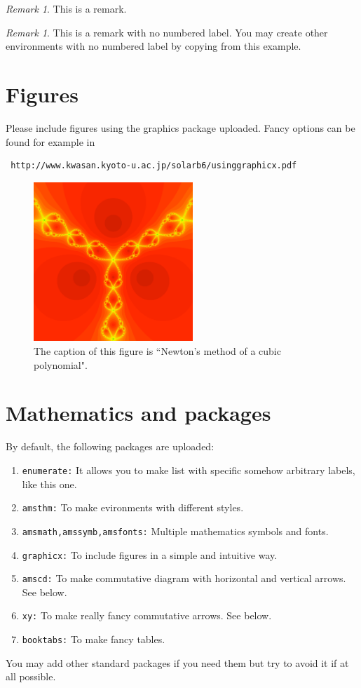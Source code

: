 \documentclass[12,twoside]{TFG-GM}
\theoremstyle{definition}
\theoremstyle{remark}
\newtheorem{remark}[theorem]{Remark}
\newtheorem*{remarknonumber}{Remark}
\begin{document}
\begin{remark}
This is a remark. 
\end{remark}

\begin{remarknonumber}
This is a remark with no numbered label. You may create other environments with no numbered label by copying from this example.
\end{remarknonumber}

\section{Figures}

Please include figures using the graphics package uploaded.  Fancy options can be found for example in  \begin{verbatim} http://www.kwasan.kyoto-u.ac.jp/solarb6/usinggraphicx.pdf \end{verbatim}

\begin{figure}[htb!]
\begin{center}
\includegraphics[width=6cm]{samplefigure.pdf}
\end{center}
\caption{\label{sample figure} \small The caption of this figure is ``Newton's method of a cubic polynomial".}
\end{figure}

\section{Mathematics and packages} \label{packages}

By default, the following packages are uploaded:
\begin{enumerate}[\bf (1)]
\item {\tt enumerate:} It allows you to make list with specific somehow arbitrary labels, like this one.
\item {\tt amsthm:} To make evironments with different styles.
\item {\tt amsmath,amssymb,amsfonts:} Multiple mathematics symbols and fonts.
\item {\tt graphicx:} To include figures in a simple and intuitive way.
\item {\tt amscd:} To make commutative diagram with horizontal and vertical arrows. See below.
\item {\tt xy:} To make really fancy commutative arrows. See below.
\item {\tt booktabs:} To make fancy tables.
\end{enumerate}
You may add other standard packages if you need them but try to avoid it if at all possible.
\end{document}
